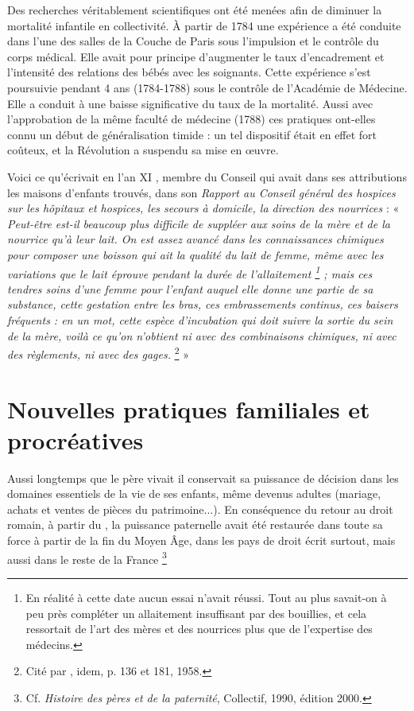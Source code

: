 Des recherches véritablement scientifiques ont été menées afin de diminuer la mortalité infantile en collectivité. À partir de 1784 une expérience a été conduite dans l'une des salles de la Couche de Paris sous l'impulsion et le contrôle du corps médical. Elle avait pour principe d'augmenter le taux d'encadrement et l'intensité des relations des bébés avec les soignants. Cette expérience s'est poursuivie pendant 4 ans (1784-1788) sous le contrôle de l'Académie de Médecine. Elle a conduit à une baisse significative du taux de la mortalité. Aussi avec l'approbation de la même faculté de médecine (1788) ces pratiques ont-elles connu un début de généralisation timide : un tel dispositif était en effet fort coûteux, et la Révolution a suspendu sa mise en œuvre.

 Voici ce qu'écrivait en l'an XI , membre du Conseil qui avait dans ses attributions les maisons d'enfants trouvés, dans son \emph{Rapport au Conseil général des hospices sur les hôpitaux et hospices, les secours à domicile, la direction des nourrices} : « \emph{Peut-être est-il beaucoup plus difficile de suppléer aux soins de la mère et de la nourrice qu'à leur lait. On est assez avancé dans les connaissances chimiques pour composer une boisson qui ait la qualité du lait de femme, même avec les variations que le lait éprouve pendant la durée de l'allaitement%
\footnote{En réalité à cette date aucun essai n'avait réussi. Tout au plus savait-on à peu près compléter un allaitement insuffisant par des bouillies, et cela ressortait de l'art des mères et des nourrices plus que de l'expertise des médecins.} 
; mais ces tendres soins d'une femme pour l'enfant auquel elle donne une partie de sa substance, cette gestation entre les bras, ces embrassements continus, ces baisers fréquents : en un mot, cette espèce d'incubation qui doit suivre la sortie du sein de la mère, voilà ce qu'on n'obtient ni avec des combinaisons chimiques, ni avec des règlements, ni avec des gages.}%
\footnote{Cité par , idem, p. 136 et 181, 1958.} »

  

  
 \section{Nouvelles pratiques familiales et procréatives}

 
Aussi longtemps que le père vivait il conservait sa puissance de décision dans les domaines essentiels de la vie de ses enfants, même devenus adultes (mariage, achats et ventes de pièces du patrimoine...). En conséquence du retour au droit romain, à partir du , la puissance paternelle avait été restaurée dans toute sa force à partir de la fin du Moyen Âge, dans les pays de droit écrit surtout, mais aussi dans le reste de la France
\footnote{Cf. \emph{Histoire des pères et de la paternité}, Collectif, 1990, édition 2000.}%


